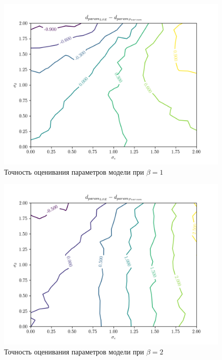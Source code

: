 \begin{figure}[h]
  \centering
  \includegraphics[width=150mm]{fig/linear/param/beta-1_param.png}
  \caption{Точность оценивания параметров модели при \( \beta = 1\)}
\end{figure}

\begin{figure}[h]
  \centering
  \includegraphics[width=150mm]{fig/linear/param/beta-2_param.png}
  \caption{Точность оценивания параметров модели при \( \beta = 2 \)}
\end{figure}

